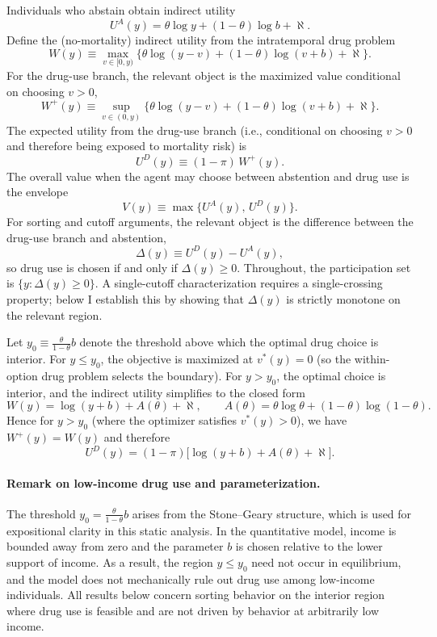 Individuals who abstain obtain indirect utility
\[
U^{A}(y)=\theta\log y + (1-\theta)\log b + \aleph.
\]
Define the (no-mortality) indirect utility from the intratemporal drug problem
\[
W(y)\equiv \max_{v\in[0,y)}\{\theta\log(y-v)+(1-\theta)\log(v+b)+\aleph\}.
\]
For the drug-use branch, the relevant object is the maximized value conditional on choosing $v>0$,
\[
W^{+}(y)\equiv \sup_{v\in(0,y)}\{\theta\log(y-v)+(1-\theta)\log(v+b)+\aleph\}.
\]
The expected utility from the drug-use branch (i.e., conditional on choosing $v>0$ and therefore being exposed to mortality risk) is
\[
U^{D}(y)\equiv (1-\pi)\,W^{+}(y).
\]
The overall value when the agent may choose between abstention and drug use is the envelope
\[
V(y)\equiv \max\{U^{A}(y),\,U^{D}(y)\}.
\]
For sorting and cutoff arguments, the relevant object is the difference between the drug-use branch and abstention,
\[
\Delta(y)\equiv U^{D}(y)-U^{A}(y),
\]
so drug use is chosen if and only if $\Delta(y)\ge 0$. Throughout, the participation set is $\{y:\Delta(y)\ge 0\}$. A single-cutoff characterization requires a single-crossing property; below I establish this by showing that $\Delta(y)$ is strictly monotone on the relevant region.

Let $y_0\equiv \frac{\theta}{1-\theta}b$ denote the threshold above which the optimal drug choice is interior. For $y\le y_0$, the objective is maximized at $v^*(y)=0$ (so the within-option drug problem selects the boundary). For $y>y_0$, the optimal choice is interior, and the indirect utility simplifies to the closed form
\[
W(y)=\log(y+b)+A(\theta)+\aleph,
\qquad
A(\theta)=\theta\log\theta+(1-\theta)\log(1-\theta).
\]
Hence for $y>y_0$ (where the optimizer satisfies $v^*(y)>0$), we have $W^{+}(y)=W(y)$ and therefore
\[
U^{D}(y)=(1-\pi)\big[\log(y+b)+A(\theta)+\aleph\big].
\]

\paragraph{Remark on low-income drug use and parameterization.}
The threshold $y_0=\frac{\theta}{1-\theta}b$ arises from the Stone--Geary structure, which is used for expositional clarity in this static analysis. In the quantitative model, income is bounded away from zero and the parameter $b$ is chosen relative to the lower support of income. As a result, the region $y\le y_0$ need not occur in equilibrium, and the model does not mechanically rule out drug use among low-income individuals. All results below concern sorting behavior on the interior region where drug use is feasible and are not driven by behavior at arbitrarily low income.

